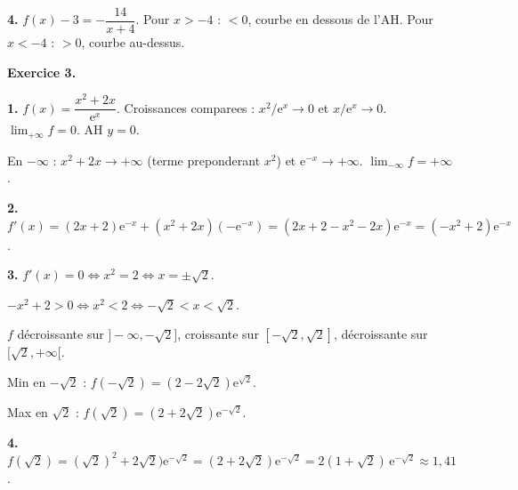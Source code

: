 \textbf{4.} $f(x) - 3 = -\dfrac{14}{x+4}$. Pour $x > -4$ : $< 0$, courbe en dessous de l'AH. Pour $x < -4$ : $> 0$, courbe au-dessus.

\bigskip


\textbf{Exercice 3.}

\textbf{1.} $f(x) = \dfrac{x^2+2x}{\mathrm{e}^x}$. Croissances comparees : $x^2/\mathrm{e}^x \to 0$ et $x/\mathrm{e}^x \to 0$. $\lim_{+\infty} f = \boxed{0}$. AH $y = 0$.

En $-\infty$ : $x^2+2x \to +\infty$ (terme preponderant $x^2$) et $\mathrm{e}^{-x} \to +\infty$. $\lim_{-\infty} f = \boxed{+\infty}$.

\textbf{2.} $f'(x) = (2x+2)\mathrm{e}^{-x} + (x^2+2x)(-\mathrm{e}^{-x}) = (2x+2-x^2-2x)\mathrm{e}^{-x} = (-x^2+2)\mathrm{e}^{-x}$.

\textbf{3.} $f'(x) = 0 \iff x^2 = 2 \iff x = \pm\sqrt{2}$.

$-x^2+2 > 0 \iff x^2 < 2 \iff -\sqrt{2} < x < \sqrt{2}$.

$f$ décroissante sur $]-\infty, -\sqrt{2}]$, croissante sur $[-\sqrt{2}, \sqrt{2}]$, décroissante sur $[\sqrt{2}, +\infty[$.

Min en $-\sqrt{2}$ : $f(-\sqrt{2}) = (2-2\sqrt{2})\mathrm{e}^{\sqrt{2}}$.

Max en $\sqrt{2}$ : $f(\sqrt{2}) = (2+2\sqrt{2})\mathrm{e}^{-\sqrt{2}}$.

\textbf{4.} $f(\sqrt{2}) = (\sqrt{2})^2 + 2\sqrt{2})\mathrm{e}^{-\sqrt{2}} = (2+2\sqrt{2})\mathrm{e}^{-\sqrt{2}} = \boxed{2(1+\sqrt{2})\,\mathrm{e}^{-\sqrt{2}}} \approx 1{,}41$.
